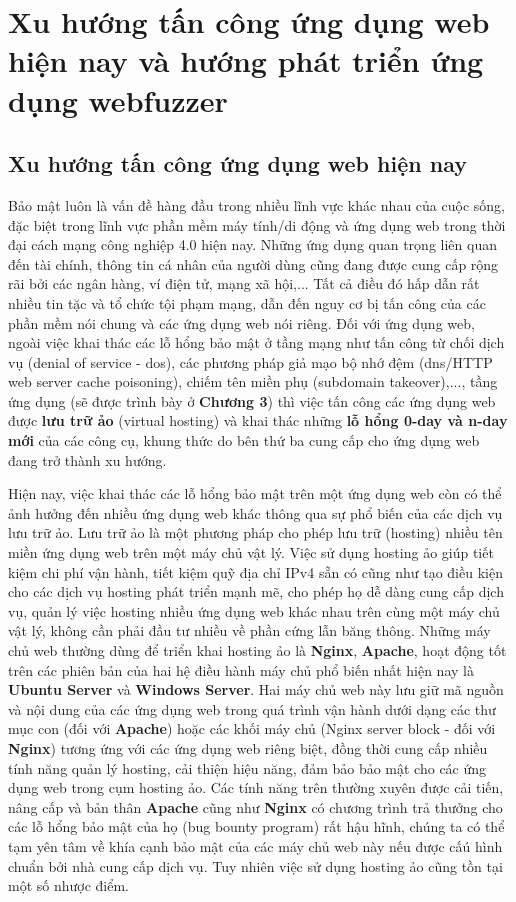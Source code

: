\chapter{Xu hướng tấn công ứng dụng web hiện nay và hướng phát triển ứng dụng webfuzzer}
\section{Xu hướng tấn công ứng dụng web hiện nay}
Bảo mật luôn là vấn đề hàng đầu trong nhiều lĩnh vực khác nhau của cuộc sống, đặc biệt trong lĩnh vực phần mềm máy tính/di động và ứng dụng web trong thời đại cách mạng công nghiệp 4.0 hiện nay. Những ứng dụng quan trọng liên quan đến tài chính, thông tin cá nhân của người dùng cũng đang được cung cấp rộng rãi bởi các ngân hàng, ví điện tử, mạng xã hội,... Tất cả điều đó hấp dẫn rất nhiều tin tặc và tổ chức tội phạm mạng, dẫn đến nguy cơ bị tấn công của các phần mềm nói chung và các ứng dụng web nói riêng. Đối với ứng dụng web, ngoài việc khai thác các lỗ hổng bảo mật ở tầng mạng như tấn công từ chối dịch vụ (denial of service - \acrshort{dos}), các phương pháp giả mạo bộ nhớ đệm (\acrshort{dns}/HTTP web server cache poisoning), chiếm tên miền phụ (subdomain takeover),..., tầng ứng dụng (sẽ được trình bày ở \textbf{Chương 3}) thì việc tấn công các ứng dụng web được \textbf{lưu trữ ảo} (virtual hosting) và khai thác những \textbf{lỗ hổng 0-day và n-day mới} của các công cụ, khung thức do bên thứ ba cung cấp cho ứng dụng web đang trở thành xu hướng. \par
Hiện nay, việc khai thác các lỗ hổng bảo mật trên một ứng dụng web còn có thể ảnh hưởng đến nhiều ứng dụng web khác thông qua sự phổ biến của các dịch vụ lưu trữ ảo. Lưu trữ ảo là một phương pháp cho phép lưu trữ (hosting) nhiều tên miền ứng dụng web trên một máy chủ vật lý. Việc sử dụng hosting ảo giúp tiết kiệm chi phí vận hành, tiết kiệm quỹ địa chỉ IPv4 sẵn có cũng như tạo điều kiện cho các dịch vụ hosting phát triển mạnh mẽ, cho phép họ dễ dàng cung cấp dịch vụ, quản lý việc hosting nhiều ứng dụng web khác nhau trên cùng một máy chủ vật lý, không cần phải đầu tư nhiều về phần cứng lẫn băng thông. Những máy chủ web thường dùng để triển khai hosting ảo là \textbf{Nginx}, \textbf{Apache}, hoạt động tốt trên các phiên bản của hai hệ điều hành máy chủ phổ biến nhất hiện nay là \textbf{Ubuntu Server} và \textbf{Windows Server}. Hai máy chủ web này lưu giữ mã nguồn và nội dung của các ứng dụng web trong quá trình vận hành dưới dạng các thư mục con (đối với \textbf{Apache}) hoặc các khối máy chủ (Nginx server block - đối với \textbf{Nginx}) tương ứng với các ứng dụng web riêng biệt, đồng thời cung cấp nhiều tính năng quản lý hosting, cải thiện hiệu năng, đảm bảo bảo mật cho các ứng dụng web trong cụm hosting ảo. Các tính năng trên thường xuyên được cải tiến, nâng cấp và bản thân \textbf{Apache} cũng như \textbf{Nginx} có chương trình trả thưởng cho các lỗ hổng bảo mật của họ (bug bounty program) rất hậu hĩnh, chúng ta có thể tạm yên tâm về khía cạnh bảo mật của các máy chủ web này nếu được cấú hình chuẩn bởi nhà cung cấp dịch vụ. Tuy nhiên việc sử dụng hosting ảo cũng tồn tại một số nhược điểm.
